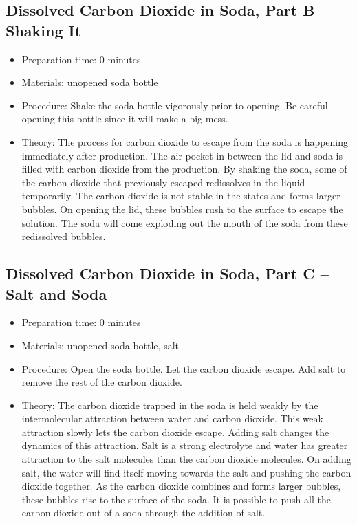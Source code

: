 \subsection{Dissolved Carbon Dioxide in Soda, Part B – Shaking It}
\begin{itemize}
\item{Preparation time: 0 minutes}
\item{Materials: unopened soda bottle}
\item{Procedure: Shake the soda bottle vigorously prior to opening. Be careful opening this bottle since it will make a big mess.}
\item{Theory: The process for carbon dioxide to escape from the soda is happening immediately after production. The air pocket in between the lid and soda is filled with carbon dioxide from the production. By shaking the soda, some of the carbon dioxide that previously escaped redissolves in the liquid temporarily. The carbon dioxide is not stable in the states and forms larger bubbles. On opening the lid, these bubbles rush to the surface to escape the solution. The soda will come exploding out the mouth of the soda from these redissolved bubbles. }
\end{itemize}

\subsection{Dissolved Carbon Dioxide in Soda, Part C – Salt and Soda}
\begin{itemize}
\item{Preparation time: 0 minutes}
\item{Materials: unopened soda bottle, salt}
\item{Procedure: Open the soda bottle. Let the carbon dioxide escape. Add salt to remove the rest of the carbon dioxide.}
\item{Theory: The carbon dioxide trapped in the soda is held weakly by the intermolecular attraction between water and carbon dioxide. This weak attraction slowly lets the carbon dioxide escape. Adding salt changes the dynamics of this attraction. Salt is a strong electrolyte and water has greater attraction to the salt molecules than the carbon dioxide molecules. On adding salt, the water will find itself moving towards the salt and pushing the carbon dioxide together. As the carbon dioxide combines and forms larger bubbles, these bubbles rise to the surface of the soda. It is possible to push all the carbon dioxide out of a soda through the addition of salt.}
\end{itemize}

